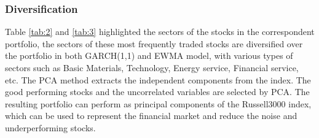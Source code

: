 \documentclass[11pt,a4paper]{article}
\begin{document}
    
    \subsubsection{Diversification}
    Table \ref{tab:2} and \ref{tab:3} highlighted the sectors of the stocks in the correspondent portfolio, the sectors of these most frequently traded stocks are diversified over the portfolio in both GARCH(1,1) and EWMA model, with various types of sectors such as Basic Materials, Technology, Energy service, Financial service, etc. The PCA method extracts the independent components from the index. The good performing stocks and the uncorrelated variables are selected by PCA. The resulting portfolio can perform as principal components of the Russell3000 index, which can be used to represent the financial market and reduce the noise and underperforming stocks.
    
    
\end{document}
